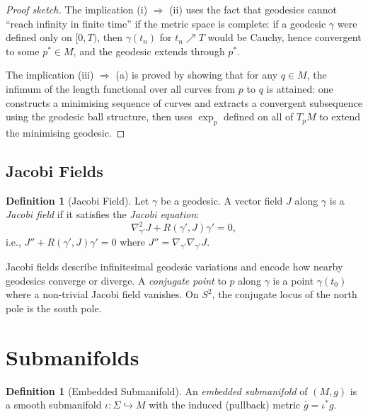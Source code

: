 \documentclass[12pt,a4paper]{amsart}
\theoremstyle{definition}
\newtheorem{definition}[theorem]{Definition}
\begin{document}
\begin{proof}[Proof sketch]
The implication (i) $\Rightarrow$ (ii) uses the fact that geodesics cannot
``reach infinity in finite time'' if the metric space is complete: if a
geodesic $\gamma$ were defined only on $[0, T)$, then $\gamma(t_n)$ for
$t_n \nearrow T$ would be Cauchy, hence convergent to some $p^* \in M$,
and the geodesic extends through $p^*$.

The implication (iii) $\Rightarrow$ (a) is proved by showing that for any
$q \in M$, the infimum of the length functional over all curves from $p$
to $q$ is attained: one constructs a minimising sequence of curves and
extracts a convergent subsequence using the geodesic ball structure, then
uses $\exp_p$ defined on all of $T_pM$ to extend the minimising geodesic.
\end{proof}

\subsection{Jacobi Fields}

\begin{definition}[Jacobi Field]
Let $\gamma$ be a geodesic. A vector field $J$ along $\gamma$ is a
\emph{Jacobi field} if it satisfies the \emph{Jacobi equation}:
\[
  \nabla^2_{\gamma'} J + R(\gamma', J)\gamma' = 0,
\]
i.e., $J'' + R(\gamma', J)\gamma' = 0$ where $J'' = \nabla_{\gamma'}\nabla_{\gamma'} J$.
\end{definition}

Jacobi fields describe infinitesimal geodesic variations and encode how
nearby geodesics converge or diverge. A \emph{conjugate point} to $p$
along $\gamma$ is a point $\gamma(t_0)$ where a non-trivial Jacobi field
vanishes. On $S^2$, the conjugate locus of the north pole is the south pole.

\section{Submanifolds}
\label{sec:submanifolds}

\begin{definition}[Embedded Submanifold]
An \emph{embedded submanifold} of $(M, g)$ is a smooth submanifold
$\iota: \Sigma \hookrightarrow M$ with the induced (pullback) metric
$\bar{g} = \iota^* g$.
\end{definition}
\end{document}
